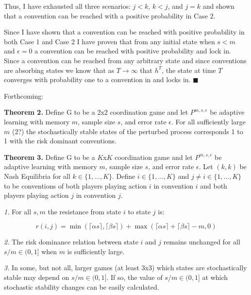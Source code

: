 \documentclass{article}
\begin{document}
\vskip12pt

Thus, I have exhausted all three scenarios: $j<k$, $k<j$, and $j=k$ and shown that a convention can be reached with a positive probability in Case 2.

\vskip18pt

Since I have shown that a convention can be reached with positive probability in both Case 1 and Case 2 I have proven that from any initial state when $s<m$ and $\epsilon=0$ a convention can be reached with positive probability and lock in. Since a convention can be reached from any arbitrary state and since conventions are absorbing states we know that as $T \rightarrow \infty$ that $h^T$, the state at time $T$ converges with probability one to a convention in and locks in. $\blacksquare$

\pagebreak

Forthcoming:

\textbf{Theorem 2.} Define G to be a 2x2 coordination game and let $P^{m,s,\epsilon}$ be adaptive learning with memory $m$, sample size $s$, and error rate $\epsilon$. For all sufficiently large $m$ (2?) the stochastically stable states of the perturbed process corresponds 1 to 1 with the risk dominant conventions.

\vskip12pt

\textbf{Theorem 3.} Define G to be a $K$x$K$ coordination game and let $P^{m,s,\epsilon}$ be adaptive learning with memory $m$, sample size $s$, and error rate $\epsilon$. Let $(k,k)$ be Nash Equilibria for all $k \in \{1,...,K\}$. Define $i \in \{1,...,K\}$ and $j \neq i \in \{1,...,K\}$ to be conventions of both players playing action $i$ in convention $i$ and both players playing action $j$ in convention $j$.

\textit{1.} For all $s, m$ the resistance from state $i$ to state $j$ is:

$$r(i,j)=\min(\lceil \alpha s \rceil,\lceil \beta s \rceil)+\max(\lceil \alpha s \rceil+\lceil \beta s \rceil-m,0)$$

\textit{2.} The risk dominance relation between state $i$ and $j$ remains unchanged for all $s/m \in (0,1]$ when $m$ is sufficiently large.

\textit{3.} In some, but not all, larger games (at least 3x3) which states are stochastically stable may depend on $s/m \in (0,1]$. If so, the value of $s/m \in (0,1]$ at which stochastic stability changes can be easily calculated.




\end{document}
